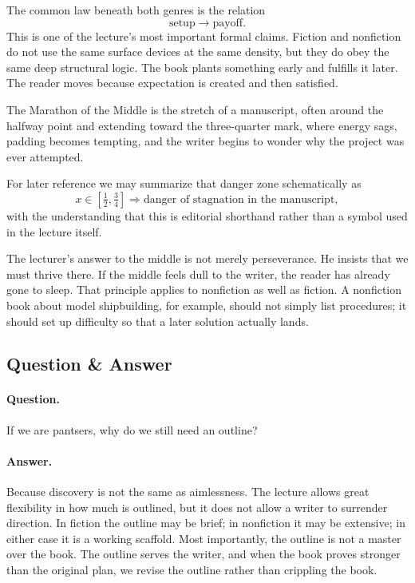 The common law beneath both genres is the relation
\begin{equation}
\text{setup} \to \text{payoff}.
\end{equation}
This is one of the lecture's most important formal claims. Fiction and nonfiction do not use the same surface devices at the same density, but they do obey the same deep structural logic. The book plants something early and fulfills it later. The reader moves because expectation is created and then satisfied.

\begin{definition}
The Marathon of the Middle is the stretch of a manuscript, often around the halfway point and extending toward the three-quarter mark, where energy sags, padding becomes tempting, and the writer begins to wonder why the project was ever attempted.
\end{definition}

For later reference we may summarize that danger zone schematically as
\begin{equation}
x \in \left[\tfrac12,\tfrac34\right] \Rightarrow \text{danger of stagnation in the manuscript},
\end{equation}
with the understanding that this is editorial shorthand rather than a symbol used in the lecture itself.

The lecturer's answer to the middle is not merely perseverance. He insists that we must thrive there. If the middle feels dull to the writer, the reader has already gone to sleep. That principle applies to nonfiction as well as fiction. A nonfiction book about model shipbuilding, for example, should not simply list procedures; it should set up difficulty so that a later solution actually lands.

\subsection{Question \& Answer}

\paragraph{Question.} If we are pantsers, why do we still need an outline?

\paragraph{Answer.} Because discovery is not the same as aimlessness. The lecture allows great flexibility in how much is outlined, but it does not allow a writer to surrender direction. In fiction the outline may be brief; in nonfiction it may be extensive; in either case it is a working scaffold. Most importantly, the outline is not a master over the book. The outline serves the writer, and when the book proves stronger than the original plan, we revise the outline rather than crippling the book.

